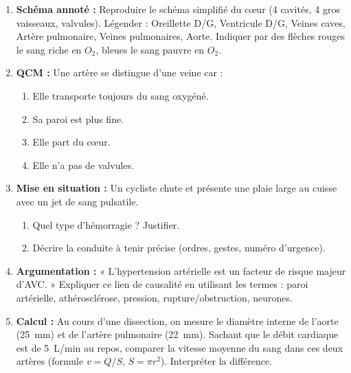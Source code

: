 \documentclass[11pt]{article}
\begin{document}
\begin{exercice}
\begin{enumerate}
\item \textbf{Schéma annoté :} Reproduire le schéma simplifié du cœur (4 cavités, 4 gros vaisseaux, valvules). Légender : Oreillette D/G, Ventricule D/G, Veines caves, Artère pulmonaire, Veines pulmonaires, Aorte. Indiquer par des flèches rouges le sang riche en $O_2$, bleues le sang pauvre en $O_2$.
\item \textbf{QCM :} Une artère se distingue d'une veine car :
    \begin{enumerate}
    \item Elle transporte toujours du sang oxygéné.
    \item Sa paroi est plus fine.
    \item Elle part du cœur.
    \item Elle n'a pas de valvules.
    \end{enumerate}
\item \textbf{Mise en situation :} Un cycliste chute et présente une plaie large au cuisse avec un jet de sang pulsatile.
    \begin{enumerate}
    \item Quel type d'hémorragie ? Justifier.
    \item Décrire la conduite à tenir précise (ordres, gestes, numéro d'urgence).
    \end{enumerate}
\item \textbf{Argumentation :} « L'hypertension artérielle est un facteur de risque majeur d'AVC. » Expliquer ce lien de causalité en utilisant les termes : paroi artérielle, athérosclérose, pression, rupture/obstruction, neurones.
\item \textbf{Calcul :} Au cours d'une dissection, on mesure le diamètre interne de l'aorte (\SI{25}{mm}) et de l'artère pulmonaire (\SI{22}{mm}). Sachant que le débit cardiaque est de \SI{5}{L/min} au repos, comparer la vitesse moyenne du sang dans ces deux artères (formule $v = Q/S$, $S = \pi r^2$). Interpréter la différence.
\end{enumerate}
\end{exercice}
\end{document}
